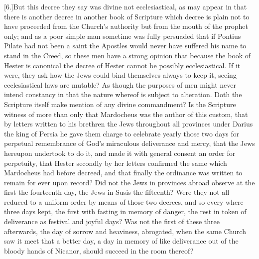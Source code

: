 [6.]But this decree they say was divine not ecclesiastical, as may appear in that there is another decree in another book of Scripture which decree is plain not to have proceeded from the Church’s authority but from the mouth of the prophet only; and as a poor simple man sometime was fully persuaded that if Pontius Pilate had not been a saint the Apostles would never have suffered his name to stand in the Creed, so  these men have a strong opinion that because the book of Hester is canonical the decree of Hester cannot be possibly ecclesiastical. If it were, they ask how the Jews could bind themselves always to keep it, seeing ecclesiastical laws are mutable? As though the purposes of men might never intend constancy in that the nature whereof is subject to alteration. Doth the Scripture itself make mention of any divine commandment? Is the Scripture witness of more than only that Mardocheus was the author of this custom, that by letters written to his brethren the Jews throughout all provinces under Darius the king of Persia he gave them charge to celebrate yearly those two days for perpetual remembrance of God’s miraculous deliverance and mercy, that the Jews hereupon undertook to do it, and made it with general consent an order for perpetuity, that Hester secondly by her letters confirmed the same which Mardocheus had before decreed, and that finally the ordinance was written to remain for ever upon record? Did not the Jews in provinces abroad observe at the first the fourteenth day, the Jews in Susis the fifteenth? Were they not all reduced to a uniform order by means of those two decrees, and so every where three days kept, the first with fasting in memory of danger, the rest in token of deliverance as festival and joyful days? Was not the first of these three afterwards, the day of sorrow and heaviness, abrogated, when the same Church saw it meet that a better day, a day in memory of like deliverance out of the bloody hands of Nicanor, should succeed in the room thereof?

